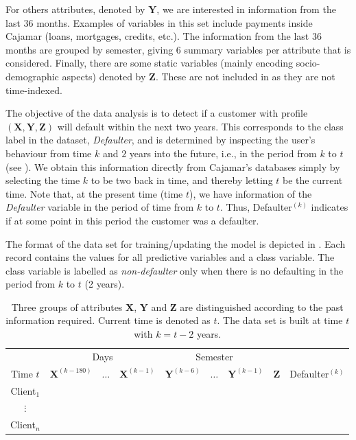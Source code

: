 \documentclass{article}
\theoremstyle{theorem}
\theoremstyle{definition}
\newcommand{\X}{\mathbf{X}}
\newcommand{\Y}{\mathbf{Y}}
\newcommand{\Z}{\mathbf{Z}}
\begin{document}
For others attributes, denoted by $\Y$, we are interested in information from the last $36$ months. Examples of variables in this set include payments inside Cajamar (loans, mortgages, credits, etc.). 
The information from the last 36 months are grouped by semester, giving $6$ summary variables per attribute that is considered. 
Finally, there are some static variables (mainly encoding socio-demographic aspects) denoted by $\Z$. These are not included in  as they are not time-indexed. 

The objective of the data analysis is to detect if a customer with profile $(\X,\Y,\Z)$ will default within the next two years. This corresponds to the class label in the dataset, \textit{Defaulter}, and is determined by inspecting the user's behaviour from time $k$ and $2$ years into the future, i.e., in the period from $k$ to $t$ (see ). We obtain this information directly from Cajamar's databases simply by selecting the time $k$ to be two back in time, and thereby letting $t$ be the current time. Note that, at the present time (time $t$), we have information of the \textit{Defaulter} variable in the period of time from $k$ to $t$. Thus,  Defaulter$^{(k)}$ indicates if at some point in this period the customer was a defaulter.

The format of the data set for training/updating the model is depicted in . Each record contains the values for all predictive variables and a class variable. The class variable is labelled as \emph{non-defaulter} only when there is no defaulting in the period from $k$ to $t$ (2 years). 
\begin{table}[ht!]
\centering
\begin{tabular}{c|ccc|ccc|c|c}
	&\multicolumn{3}{c|}{Days} & \multicolumn{3}{c|}{Semester} & \\
     Time $t$              & $\X^{(k-180)}$ & $\ldots$ & $\X^{(k-1)} $ & $\Y^{(k-6)}$  & $\ldots$ & $\Y^{(k-1)} $ & $\Z$ & Defaulter$^{(k)}$\\  
\hline
Client$_1$  &                                                  &              &                     &                               &                     &        &  \\ 
$\vdots$      &                                                 &               &                     &                                &                     &       & \\ 
Client$_n$  &                                                &               &                     &                                &                     &     & \\ 
\end{tabular} 
\caption{Three groups of attributes $\X$, $\Y$ and $\Z$ are distinguished according to the past information required. Current time is denoted as $t$. The data set is built at time $t$ with $k=t - 2$ years. }
\label{tab:TrainingDataset} 
\end{table}
\end{document}
